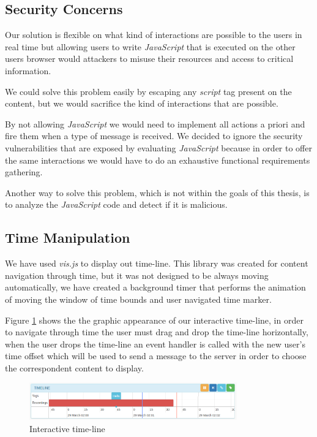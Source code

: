 	\subsection{Security Concerns}

	Our solution is flexible on what kind of interactions are possible to the users in real time but allowing users to write \emph{JavaScript} that is executed on the other users browser would attackers to misuse their resources and access to critical information.

	We could solve this problem easily by escaping any \emph{script} tag present on the content, but we would sacrifice the kind of interactions that are possible. 

	By not allowing \emph{JavaScript} we would need to implement all actions a priori and fire them when a type of message is received. We decided to ignore the security vulnerabilities that are exposed by evaluating \emph{JavaScript} because in order to offer the same interactions we would have to do an exhaustive functional requirements gathering.

	Another way to solve this problem, which is not within the goals of this thesis, is to analyze the \emph{JavaScript} code and detect if it is malicious.

	\subsection{Time Manipulation}

	We have used \emph{vis.js} to display out time-line. This library was created for content navigation through time, but it was not designed to be always moving automatically, we have created a background timer that performs the animation of moving the window of time bounds and user navigated time marker.

	Figure \ref{fig:timeline} shows the the graphic appearance of our interactive time-line, in order to navigate through time the user must drag and drop the time-line horizontally, when the user drops the time-line an event handler is called with the new user's time offset which will be used to send a message to the server in order to choose the correspondent content to display. 

	\begin{figure}[!htb]
		\centering
		\includegraphics[width=0.8\textwidth]{figures/timeline.png}
		\caption{Interactive time-line}
		\label{fig:timeline}
	\end{figure}

